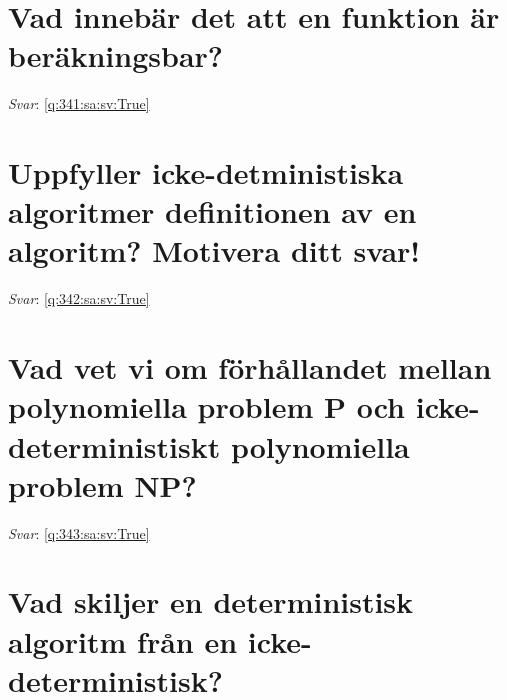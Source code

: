 \documentclass[a4paper,11pt,oneside]{book}
\begin{document}
\begin{sloppypar}
\section{Vad inneb\"ar det att en funktion \"ar ber\"akningsbar?}

\label{q:341:sa:sv:False}

\vspace{2cm}

\noindent\makebox[\textwidth]{\hrulefill}

\vspace{1cm}

\textit{Svar}: \autoref{q:341:sa:sv:True}



\section{Uppfyller icke-detministiska algoritmer definitionen av en algoritm? Motivera ditt svar!}

\label{q:342:sa:sv:False}

\vspace{2cm}

\noindent\makebox[\textwidth]{\hrulefill}

\vspace{1cm}

\textit{Svar}: \autoref{q:342:sa:sv:True}



\section{Vad vet vi om f\"orh\r{a}llandet mellan polynomiella problem P och icke-deterministiskt polynomiella problem NP?}

\label{q:343:sa:sv:False}

\vspace{2cm}

\noindent\makebox[\textwidth]{\hrulefill}

\vspace{1cm}

\textit{Svar}: \autoref{q:343:sa:sv:True}



\section{Vad skiljer en deterministisk algoritm fr\r{a}n en icke-deterministisk?}

\label{q:344:sa:sv:False}


\end{sloppypar}
\end{document}
